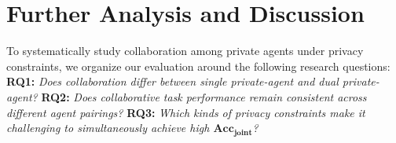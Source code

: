 \section{Further Analysis and Discussion}
\label{sec:analysis}

To systematically study collaboration among private agents under privacy constraints, we organize our evaluation around the following research questions:
\newline\textbf{RQ1:} \textit{Does collaboration differ between single private-agent and dual private-agent?}
\newline\textbf{RQ2:} \textit{Does collaborative task performance remain consistent across different agent pairings?}
\newline\textbf{RQ3:} \textit{Which kinds of privacy constraints make it challenging to simultaneously achieve high $\mathbf{Acc}_{\mathbf{joint}}$?}







